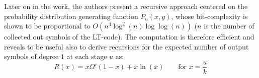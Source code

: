 Later on in the work, the authors present a recursive approach centered on the probability distribution generating function $P_u(x,y)$, whose bit-complexity is shown to be proportional to $O(n^3\log^2(n)\log\log(n))$ ($n$ is the number of collected out symbols of the LT-code). The computation is therefore efficient and reveals to be useful also to derive recursions for the expected number of output symbols of degree $1$ at each stage $u$ as:
\begin{equation}
  R(x) = x\Omega'(1-x)+x\ln(x) \qquad \text{for } x = \frac{u}{k}
\end{equation}
